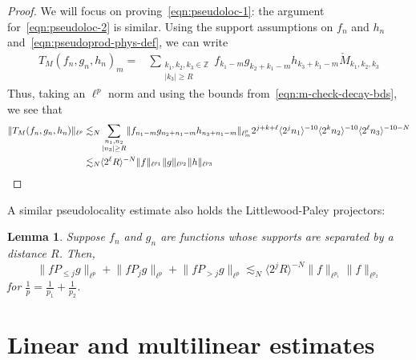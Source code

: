 \documentclass[letterpaper, reqno,final]{amsart}
\newcommand{\jBra}[1]{\langle #1 \rangle}
\newcommand{\bbZ}{\mathbb{Z}}
\newtheorem{lemma}[thm]{Lemma}
\begin{document}
\begin{proof}
    We will focus on proving~\eqref{eqn:pseudoloc-1}: the argument for~\eqref{eqn:pseudoloc-2} is similar.  Using the support assumptions on $f_n$ and $h_n$ and~\eqref{eqn:pseudoprod-phys-def}, we can write
    \begin{equation*}\begin{split}
        T_M(f_n,g_n,h_n)_m =& \sum_{\substack{k_1, k_2, k_3 \in \bbZ\\ |k_3| \geq R}} f_{k_1 - m}g_{k_2 + k_1 - m}h_{k_3 + k_1 - m} \check{M}_{k_1, k_2, k_3}
    \end{split}\end{equation*}
    Thus, taking an $\ell^p$ norm and using the bounds from~\eqref{eqn:m-check-decay-bds}, we see that
    \begin{equation*}\begin{split}
        \lVert T_M(f_n,g_n,h_n) \rVert_{\ell^p} \lesssim_N&  \sum_{\substack{n_1, n_2\\ |n_3| \geq R}} \lVert f_{n_1 - m}g_{n_2 + n_1 - m}h_{n_3 + n_1 - m}\rVert_{\ell^p_m} 2^{j+k+\ell} \jBra{2^j n_1}^{-10}\jBra{2^k n_2}^{-10}\jBra{2^\ell n_3}^{-10-N}\\%
        \lesssim_N& \jBra{2^{\ell}R}^{-N} \lVert f \rVert_{\ell^{p_1}} \lVert g \rVert_{\ell^{p_2}} \lVert h \rVert_{\ell^{p_3}}\qedhere
    \end{split}\end{equation*}
\end{proof}

    A similar pseudolocality estimate also holds the Littlewood-Paley projectors:
    \begin{lemma}\label{lem:LP-pseudoloc-lemma}
        Suppose $f_n$ and $g_n$ are functions whose supports are separated by a distance $R$.  Then,
        \begin{equation*}
            \lVert f P_{\leq j} g \rVert_{\ell^p} + \lVert f P_{j} g \rVert_{\ell^p} + \lVert f P_{> j} g \rVert_{\ell^p} \lesssim_N \jBra{2^j R}^{-N}\lVert f \rVert_{\ell^{p_1}}\lVert f \rVert_{\ell^{p_2}}
        \end{equation*}
        for $\frac{1}{p} = \frac{1}{p_1} + \frac{1}{p_2}$.
    \end{lemma}
	
\section{Linear and multilinear estimates\label{sec:lin-est}}
\end{document}
